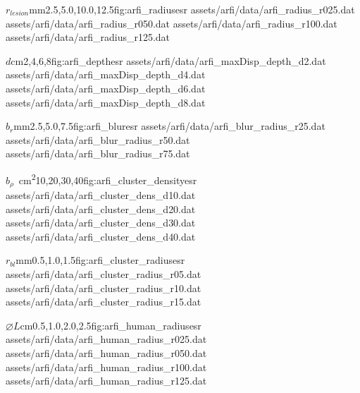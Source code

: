 		\begin{multicols}{2}
			\characterizationDataTable%
				{$r_{lesion}$}{mm}{2.5,5.0,10.0,12.5}{fig:arfi_radius}{esr}%
				{assets/arfi/data/arfi_radius_r025.dat}%
				{assets/arfi/data/arfi_radius_r050.dat}%
				{assets/arfi/data/arfi_radius_r100.dat}%
				{assets/arfi/data/arfi_radius_r125.dat}

			\characterizationDataTable%
				{$d$}{cm}{2,4,6,8}{fig:arfi_depth}{esr}%
				{assets/arfi/data/arfi_maxDisp_depth_d2.dat}%
				{assets/arfi/data/arfi_maxDisp_depth_d4.dat}%
				{assets/arfi/data/arfi_maxDisp_depth_d6.dat}%
				{assets/arfi/data/arfi_maxDisp_depth_d8.dat}

			\characterizationDataTable%
				{$b_r$}{mm}{2.5,5.0,7.5}{fig:arfi_blur}{esr}%
				{assets/arfi/data/arfi_blur_radius_r25.dat}%
				{assets/arfi/data/arfi_blur_radius_r50.dat}%
				{assets/arfi/data/arfi_blur_radius_r75.dat}%
				{}

			\characterizationDataTable%
				{$b_\rho$}{\si{\per\cm\squared}}{10,20,30,40}{fig:arfi_cluster_density}{esr}%
				{assets/arfi/data/arfi_cluster_dens_d10.dat}%
				{assets/arfi/data/arfi_cluster_dens_d20.dat}%
				{assets/arfi/data/arfi_cluster_dens_d30.dat}%
				{assets/arfi/data/arfi_cluster_dens_d40.dat}

			\characterizationDataTable%
				{$r_{bl}$}{mm}{0.5,1.0,1.5}{fig:arfi_cluster_radius}{esr}%
				{assets/arfi/data/arfi_cluster_radius_r05.dat}%
				{assets/arfi/data/arfi_cluster_radius_r10.dat}%
				{assets/arfi/data/arfi_cluster_radius_r15.dat}%
				{}

			\characterizationDataTable%
				{$\diameter L$}{cm}{0.5,1.0,2.0,2.5}{fig:arfi_human_radius}{esr}%
				{assets/arfi/data/arfi_human_radius_r025.dat}%
				{assets/arfi/data/arfi_human_radius_r050.dat}%
				{assets/arfi/data/arfi_human_radius_r100.dat}%
				{assets/arfi/data/arfi_human_radius_r125.dat}
		\end{multicols}

